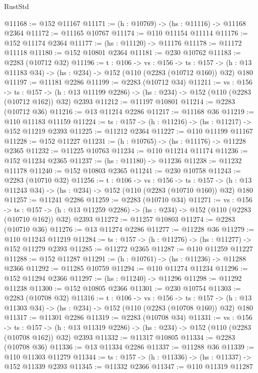 \begin{lexlean}{RustStd}
\begin{coremodule}
@11168 := @152 @11167
@11171 := (h : @10769) -> (hs : @11116) -> @11168 @2364
@11172 := @11165 @10767
@11174 := @110 @11154 @11114
@11176 := @152 @11174 @2364
@11177 := (hs : @11120) -> @11176
@11178 := @11172 @11118
@11180 := @152 @10801 @2364
@11181 := @230 @10762
@11183 := @2283 (@10712 @32)
@11196 := {t : @106} ->
  {vs : @156} ->
  {ts : @157} -> (h : @13 @11183 @34) -> (hs : @234) -> @152 (@110 (@2283 (@10712 @160)) @32) @180
@11197 := @11181 @2286
@11199 := @2283 (@10712 @34)
@11211 := {vs : @156} ->
  {ts : @157} ->
  (h : @13 @11199 @2286) -> (hs : @234) -> @152 (@110 (@2283 (@10712 @162)) @32) @2393
@11212 := @11197 @10801
@11214 := @2283 (@10712 @36)
@11216 := @13 @11214 @2286
@11217 := @11168 @36
@11219 := @110 @11183 @11159
@11224 := {ts : @157} -> (h : @11216) -> (hs : @11217) -> @152 @11219 @2393
@11225 := @11212 @2364
@11227 := @110 @11199 @11167
@11228 := @152 @11227
@11231 := (h : @10765) -> (hs : @11176) -> @11228 @2365
@11232 := @11225 @10763
@11234 := @110 @11214 @11174
@11236 := @152 @11234 @2365
@11237 := (hs : @11180) -> @11236
@11238 := @11232 @11178
@11240 := @152 @10803 @2365
@11241 := @230 @10758
@11243 := @2283 (@10710 @32)
@11256 := {t : @106} ->
  {vs : @156} ->
  {ts : @157} -> (h : @13 @11243 @34) -> (hs : @234) -> @152 (@110 (@2283 (@10710 @160)) @32) @180
@11257 := @11241 @2286
@11259 := @2283 (@10710 @34)
@11271 := {vs : @156} ->
  {ts : @157} ->
  (h : @13 @11259 @2286) -> (hs : @234) -> @152 (@110 (@2283 (@10710 @162)) @32) @2393
@11272 := @11257 @10803
@11274 := @2283 (@10710 @36)
@11276 := @13 @11274 @2286
@11277 := @11228 @36
@11279 := @110 @11243 @11219
@11284 := {ts : @157} -> (h : @11276) -> (hs : @11277) -> @152 @11279 @2393
@11285 := @11272 @2365
@11287 := @110 @11259 @11227
@11288 := @152 @11287
@11291 := (h : @10761) -> (hs : @11236) -> @11288 @2366
@11292 := @11285 @10759
@11294 := @110 @11274 @11234
@11296 := @152 @11294 @2366
@11297 := (hs : @11240) -> @11296
@11298 := @11292 @11238
@11300 := @152 @10805 @2366
@11301 := @230 @10754
@11303 := @2283 (@10708 @32)
@11316 := {t : @106} ->
  {vs : @156} ->
  {ts : @157} -> (h : @13 @11303 @34) -> (hs : @234) -> @152 (@110 (@2283 (@10708 @160)) @32) @180
@11317 := @11301 @2286
@11319 := @2283 (@10708 @34)
@11331 := {vs : @156} ->
  {ts : @157} ->
  (h : @13 @11319 @2286) -> (hs : @234) -> @152 (@110 (@2283 (@10708 @162)) @32) @2393
@11332 := @11317 @10805
@11334 := @2283 (@10708 @36)
@11336 := @13 @11334 @2286
@11337 := @11288 @36
@11339 := @110 @11303 @11279
@11344 := {ts : @157} -> (h : @11336) -> (hs : @11337) -> @152 @11339 @2393
@11345 := @11332 @2366
@11347 := @110 @11319 @11287

\end{coremodule}
\end{lexlean}

